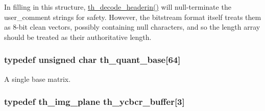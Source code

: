 In filling in this structure, \hyperlink{group__decfuncs_ga006d01d36fbe64768c571e6a12b7fc50}{th\+\_\+decode\+\_\+headerin()} will null-\/terminate the user\+\_\+comment strings for safety. However, the bitstream format itself treats them as 8-\/bit clean vectors, possibly containing null characters, and so the length array should be treated as their authoritative length. \hypertarget{theora_2libtheora-1_81_81_2include_2theora_2codec_8h_a6a1426d16beef8a311d7f0e9d2e96326}{
\subsubsection[{th\+\_\+quant\+\_\+base}]{\setlength{\rightskip}{0pt plus 5cm}typedef unsigned char th\+\_\+quant\+\_\+base\mbox{[}64\mbox{]}}}\label{theora_2libtheora-1_81_81_2include_2theora_2codec_8h_a6a1426d16beef8a311d7f0e9d2e96326}
A single base matrix. \hypertarget{theora_2libtheora-1_81_81_2include_2theora_2codec_8h_a343f7cfabad179cc4fe527cf06873f45}{
\subsubsection[{th\+\_\+ycbcr\+\_\+buffer}]{\setlength{\rightskip}{0pt plus 5cm}typedef {\bf th\+\_\+img\+\_\+plane} th\+\_\+ycbcr\+\_\+buffer\mbox{[}3\mbox{]}}}\label{theora_2libtheora-1_81_81_2include_2theora_2codec_8h_a343f7cfabad179cc4fe527cf06873f45}
